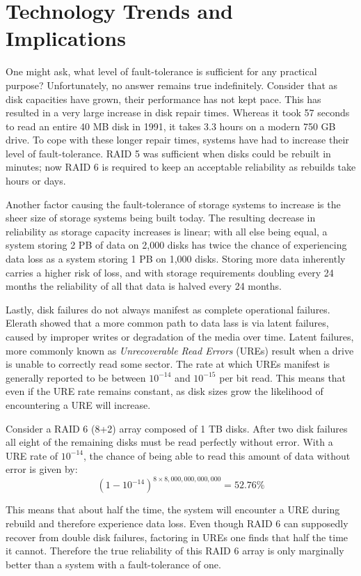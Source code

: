 \documentclass[XXX,endnotes]{usetex-v1}
\begin{document}
\section{Technology Trends and Implications}

One might ask, what level of fault-tolerance is sufficient for any practical purpose?  Unfortunately, no answer remains true indefinitely.  Consider that as disk capacities have grown, their performance has not kept pace.  This has resulted in a very large increase in disk repair times.  Whereas it took 57 seconds to read an entire 40 MB disk in 1991, it takes 3.3 hours on a modern 750 GB drive\cite{toms}.  To cope with these longer repair times, systems have had to increase their level of fault-tolerance.  RAID 5 was sufficient when disks could be rebuilt in minutes; now RAID 6 is required to keep an acceptable reliability as rebuilds take hours or days.

Another factor causing the fault-tolerance of storage systems to increase is the sheer size of storage systems being built today.  The resulting decrease in reliability as storage capacity increases is linear; with all else being equal, a system storing 2 PB of data on 2,000 disks has twice the chance of experiencing data loss as a system storing 1 PB on 1,000 disks\cite{reliability}.  Storing more data inherently carries a higher risk of loss, and with storage requirements doubling every 24 months\cite{idc} the reliability of all that data is halved every 24 months.

Lastly, disk failures do not always manifest as complete operational failures.  Elerath\cite{elerath} showed that a more common path to data lass is via latent failures, caused by improper writes or degradation of the media over time.  Latent failures, more commonly known as \emph{Unrecoverable Read Errors} (UREs) result when a drive is unable to correctly read some sector.  The rate at which UREs manifest is generally reported to be between $10^{-14}$ and $10^{-15}$ per bit read.  This means that even if the URE rate remains constant, as disk sizes grow the likelihood of encountering a URE will increase.

Consider a RAID 6 (8+2) array composed of 1 TB disks.  After two disk failures all eight of the remaining disks must be read perfectly without error.  With a URE rate of $10^{-14}$, the chance of being able to read this amount of data without error is given by:
$$(1 - 10^{-14})^{8 \times 8,000,000,000,000} = 52.76\%$$

This means that about half the time, the system will encounter a URE during rebuild and therefore experience data loss.  Even though RAID 6 can supposedly recover from double disk failures, factoring in UREs one finds that half the time it cannot.  Therefore the true reliability of this RAID 6 array is only marginally better than a system with a fault-tolerance of one.
\end{document}
